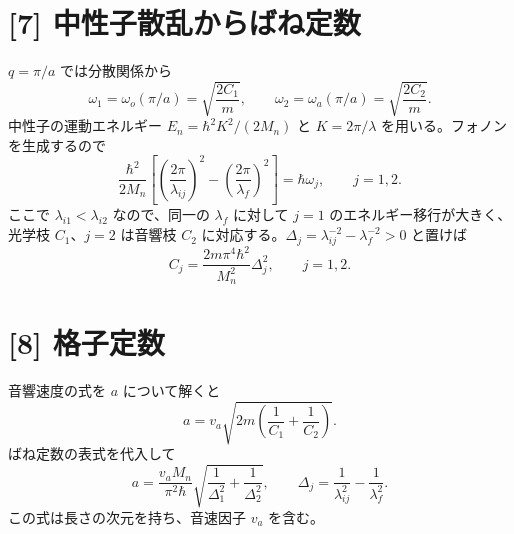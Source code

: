 \documentclass[11pt,a4paper]{article}
\begin{document}
\section*{[7] 中性子散乱からばね定数}
$q=\pi/a$ では分散関係から
\begin{equation}
 \omega_1=\omega_o(\pi/a)=\sqrt{\frac{2C_1}{m}},\qquad
 \omega_2=\omega_a(\pi/a)=\sqrt{\frac{2C_2}{m}}.
\end{equation}
中性子の運動エネルギー $E_n=\hbar^2K^2/(2M_n)$ と $K=2\pi/\lambda$ を用いる。フォノンを生成するので
\begin{equation}
 \frac{\hbar^2}{2M_n}\left[\left(\frac{2\pi}{\lambda_{ij}}\right)^2
 -\left(\frac{2\pi}{\lambda_f}\right)^2\right]=\hbar\omega_j,
 \qquad j=1,2.
\end{equation}
ここで $\lambda_{i1}<\lambda_{i2}$ なので、同一の $\lambda_f$ に対して $j=1$ のエネルギー移行が大きく、光学枝 $C_1$、$j=2$ は音響枝 $C_2$ に対応する。$\Delta_j=\lambda_{ij}^{-2}-\lambda_f^{-2}>0$ と置けば
\begin{equation}
 \boxed{C_j=\frac{2m\pi^4\hbar^2}{M_n^2}\Delta_j^2,
 \qquad j=1,2.}
\end{equation}

\section*{[8] 格子定数}
音響速度の式を $a$ について解くと
\begin{equation}
 a=v_a\sqrt{2m\left(\frac1{C_1}+\frac1{C_2}\right)}.
\end{equation}
ばね定数の表式を代入して
\begin{equation}
 \boxed{a=\frac{v_aM_n}{\pi^2\hbar}
 \sqrt{\frac1{\Delta_1^2}+\frac1{\Delta_2^2}}},\qquad
 \Delta_j=\frac1{\lambda_{ij}^2}-\frac1{\lambda_f^2}.
\end{equation}
この式は長さの次元を持ち、音速因子 $v_a$ を含む。
\end{document}
